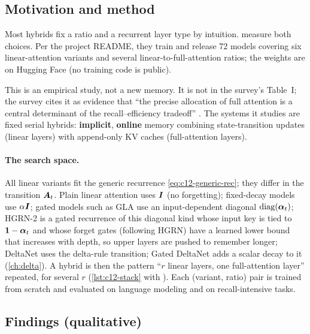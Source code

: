 \subsection{Motivation and method}

Most hybrids fix a ratio and a recurrent layer type by intuition. \citet{wang2025hybridanalysis}
measure both choices. Per the project README, they train and release 72 models covering six
linear-attention variants and several linear-to-full-attention ratios; the weights are on Hugging
Face (no training code is public).

\begin{taxonomy}
This is an empirical study, not a new memory. It is not in the survey's Table~I; the survey cites
it as evidence that ``the precise allocation of full attention is a central determinant of the
recall--efficiency tradeoff'' \citep[Section~V-A]{zhoubian2026memory}. The systems it studies are
fixed serial hybrids: \textbf{implicit}, \textbf{online} memory combining state-transition
updates (linear layers) with append-only KV caches (full-attention layers).
\end{taxonomy}

\paragraph{The search space.} All linear variants fit the generic recurrence
\eqref{eq:c12-generic-rec}; they differ in the transition $\bm{A}_t$. Plain linear attention uses
$\bm{I}$ (no forgetting); fixed-decay models use $\alpha\bm{I}$; gated models such as GLA use an
input-dependent diagonal $\operatorname{diag}(\bm{\alpha}_t)$; HGRN-2 \citep{c12-qin2024hgrn2} is a gated
recurrence of this diagonal kind whose input key is tied to $\bm1-\bm{\alpha}_t$ and whose forget gates
(following HGRN) have a learned lower bound that increases with depth, so upper layers are pushed
to remember longer; DeltaNet uses the delta-rule transition; Gated DeltaNet adds a scalar decay to
it (\cref{ch:delta}). A hybrid is then the pattern ``$r$ linear layers, one full-attention layer''
repeated, for several $r$ (\cref{lst:c12-stack} with ). Each (variant, ratio) pair is
trained from scratch and evaluated on language modeling and on recall-intensive tasks.

\subsection{Findings (qualitative)}

